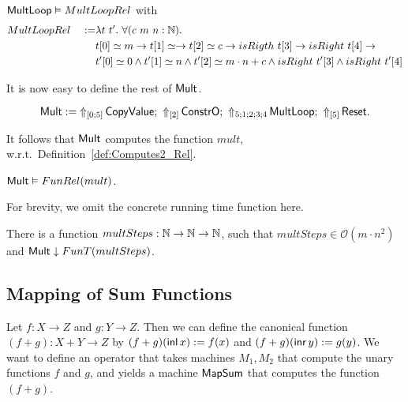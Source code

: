 \begin{lemma}
  \label{lem:Mult_Loop_Realise}
  $\MS{MultLoop} \Realise MultLoopRel$ with
  \begin{alignat*}{2}
    & MultLoopRel ~&:=& \lambda t~t'.~\forall (c~m~n:\Nat). \\
    &&& t[0] \simeq m \rightarrow t[1] \simeq \rightarrow t[2] \simeq c \rightarrow isRigth~t[3] \rightarrow isRight~t[4] \rightarrow \\
    &&& t'[0] \simeq 0 \land t'[1] \simeq n \land t'[2] \simeq m \cdot n + c \land isRight~t'[3] \land isRight~t'[4]
  \end{alignat*}
\end{lemma}

It is now easy to define the rest of $\MS{Mult}$.
\begin{definition}[$\MS{Mult}$][Mult]
  \label{def:Mult}
  \[
    \MS{Mult} :=
    \LiftTapes{\MS{CopyValue}}{\Vector{0;5}} \Seq
    \LiftTapes{\MS{ConstrO}}{\Vector{2}} \Seq
    \LiftTapes{\MS{MultLoop}}{5;1;2;3;4} \Seq
    \LiftTapes{\MS{Reset}}{\Vector{5}}.
  \]
\end{definition}

It follows that $\MS{Mult}$ computes the function $mult$, w.r.t.\ Definition~\ref{def:Computes2_Rel}.
\begin{lemma}
  \label{lem:Mult_Computes}
  $\MS{Mult} \Realise FunRel(mult)$.
\end{lemma}

For brevity,  we omit the concrete running time function here.  
\begin{lemma}
  There is a function $multSteps : \Nat\to\Nat\to\Nat$, such that $multSteps \in \mathcal{O}(m \cdot n^2)$ and
  $\MS{Mult} \TerminatesIn FunT(multSteps)$.
\end{lemma}

\subsection{Mapping of Sum Functions}
\label{sec:SumTM}
%

Let $f : X \to Z$ and $g : Y \to Z$.  Then we can define the canonical function $(f+g) : X+Y \to Z$ by $(f+g)(\inl x):=f(x)$ and
$(f+g)(\inr y):=g(y)$.  We want to define an operator that takes machines $M_1, M_2$ that compute the unary functions $f$ and $g$, and yields a
machine $\MS{MapSum}$ that computes the function $(f+g)$.

